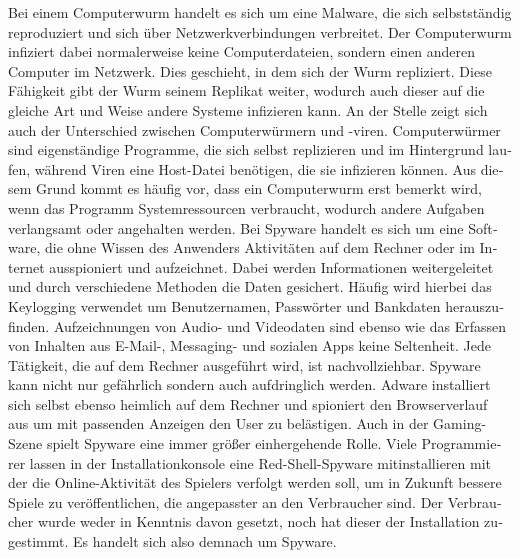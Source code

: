\begin{otherlanguage}{ngerman}
    \newline Bei einem Computerwurm handelt es sich um eine Malware, die sich selbstständig reproduziert und sich über Netzwerkverbindungen verbreitet.
    Der Computerwurm infiziert dabei normalerweise keine Computerdateien, sondern einen anderen Computer im Netzwerk. Dies geschieht, in dem sich der Wurm repliziert. Diese Fähigkeit gibt der Wurm seinem Replikat weiter, wodurch auch dieser auf die gleiche Art und Weise andere Systeme infizieren kann. 
    \newline An der Stelle zeigt sich auch der Unterschied zwischen Computerwürmern und -viren. Computerwürmer sind eigenständige Programme, die sich selbst replizieren und im Hintergrund laufen, während Viren eine Host-Datei benötigen, die sie infizieren können. Aus diesem Grund kommt es häufig vor, dass ein Computerwurm erst bemerkt wird, wenn das Programm Systemressourcen verbraucht, wodurch andere Aufgaben verlangsamt oder angehalten werden.
    \newline Bei Spyware handelt es sich um eine Software, die ohne Wissen des Anwenders Aktivitäten auf dem Rechner oder im Internet ausspioniert und aufzeichnet. 
    Dabei werden Informationen weitergeleitet und durch verschiedene Methoden die Daten gesichert. Häufig wird hierbei das Keylogging verwendet um Benutzernamen, Passwörter und Bankdaten herauszufinden. Aufzeichnungen von Audio- und Videodaten sind ebenso wie das Erfassen von Inhalten aus E-Mail-, Messaging- und sozialen Apps keine Seltenheit. Jede Tätigkeit, die auf dem Rechner ausgeführt wird, ist nachvollziehbar. 
    Spyware kann nicht nur gefährlich sondern auch aufdringlich werden. Adware installiert sich selbst ebenso heimlich auf dem Rechner und spioniert den Browserverlauf aus um mit passenden Anzeigen den User zu belästigen.
    Auch in der Gaming-Szene spielt Spyware eine immer größer einhergehende Rolle. Viele Programmierer lassen in der Installationkonsole eine Red-Shell-Spyware mitinstallieren mit der die Online-Aktivität des Spielers verfolgt werden soll, um in Zukunft bessere Spiele zu veröffentlichen, die angepasster an den Verbraucher sind. Der Verbraucher wurde weder in Kenntnis davon gesetzt, noch hat dieser der Installation zugestimmt.
    Es handelt sich also demnach um Spyware.
   
\end{otherlanguage}